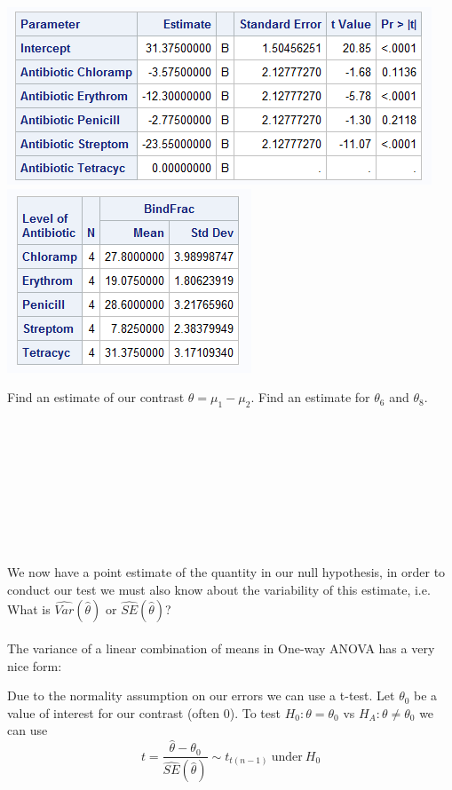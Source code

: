 \begin{center}
\includegraphics[scale=0.7]{BindFracSolution}\includegraphics[scale=0.7]{BindFracMeans}
\end{center}

Find an estimate of our contrast $\theta=\mu_1-\mu_2$.  Find an estimate for $\theta_6$ and $\theta_8$.\\~\\~\\~\\~\\~\\~\\~\\~\\~\\
We now have a point estimate of the quantity in our null hypothesis, in order to conduct our test we must also know about the variability of this estimate, i.e. What is $\hat{Var}(\hat{\theta})$ or $\hat{SE}(\hat{\theta})$?\\~\\
The variance of a linear combination of means in One-way ANOVA has a very nice form:

\newpage

Due to the normality assumption on our errors we can use a t-test.  Let $\theta_0$ be a value of interest for our contrast (often 0).  To test $H_{0}:\theta=\theta_{0}$ vs $H_{A}:\theta\neq \theta_{0}$ we can use
        $$t=\frac{\hat{\theta}-\theta_{0}}{\hat{SE}(\hat{\theta})}\sim t_{t(n-1)}~\text{under}~H_{0}$$

